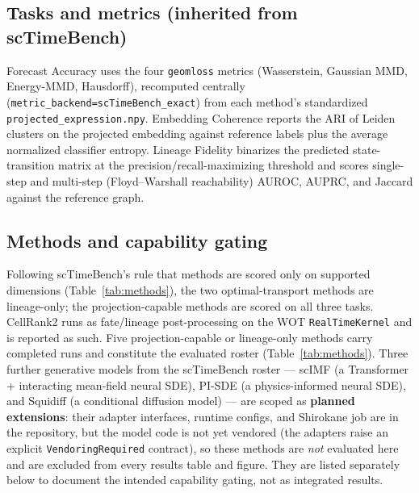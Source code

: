\documentclass[11pt]{article}
\newcommand{\code}[1]{\texttt{\small #1}}
\begin{document}
\subsection{Tasks and metrics (inherited from scTimeBench)}
Forecast Accuracy uses the four \code{geomloss} metrics (Wasserstein, Gaussian MMD,
Energy-MMD, Hausdorff), recomputed centrally
(\code{metric\_backend=scTimeBench\_exact}) from each method's standardized
\code{projected\_expression.npy}. Embedding Coherence reports the ARI of Leiden
clusters on the projected embedding against reference labels plus the average
normalized classifier entropy. Lineage Fidelity binarizes the predicted
state-transition matrix at the precision/recall-maximizing threshold and scores
single-step and multi-step (Floyd--Warshall reachability) AUROC, AUPRC, and Jaccard
against the reference graph.

\subsection{Methods and capability gating}
Following scTimeBench's rule that methods are scored only on supported dimensions
(Table~\ref{tab:methods}), the two optimal-transport methods are lineage-only; the
projection-capable methods are scored on all three tasks. CellRank2 \citep{weiler2024}
runs as fate/lineage post-processing on the WOT \citep{schiebinger2019}
\code{RealTimeKernel} and is reported as such. Five projection-capable or lineage-only
methods carry completed runs and constitute the evaluated roster
(Table~\ref{tab:methods}). Three further generative models from the scTimeBench roster
--- scIMF \citep{jiang2026scimf} (a Transformer + interacting mean-field neural SDE),
PI-SDE \citep{jiangwan2024pisde} (a physics-informed neural SDE), and
Squidiff \citep{he2026squidiff} (a conditional diffusion model) --- are scoped as
\textbf{planned extensions}: their adapter interfaces, runtime configs, and Shirokane
job are in the repository, but the model code is not yet vendored (the adapters raise
an explicit \code{VendoringRequired} contract), so these methods are \emph{not}
evaluated here and are excluded from every results table and figure. They are listed
separately below to document the intended capability gating, not as integrated results.
\end{document}
